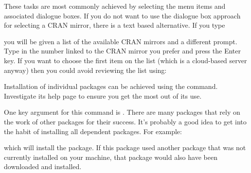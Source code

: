 These tasks are most commonly achieved by selecting the menu items and associated dialogue boxes. If you do not want to use the dialogue box approach for selecting a CRAN mirror, there is a text based alternative. If you type
\begin{knitrout}
\color{fgcolor}\begin{kframe}
\begin{alltt}
\hlstd{> }\hlstd{(}\hlstd{)}
\end{alltt}
\end{kframe}
\end{knitrout}
you will be given a list of the available CRAN mirrors and a different prompt. Type in the number linked to the CRAN mirror you prefer and press the Enter key. If you want to choose the first item on the list (which is a cloud-based server anyway) then you could avoid reviewing the list using:
\begin{knitrout}
\color{fgcolor}\begin{kframe}
\begin{alltt}
\hlstd{> }\hlstd{(}\hlstd{=}\hlstd{)}
\end{alltt}
\end{kframe}
\end{knitrout}

Installation of individual packages can be achieved using the  command. Investigate its help page to ensure you get the most out of its use. 

One key argument for this command is . There are many packages that rely on the work of other packages for their success. It's probably a good idea to get into the habit of installing all dependent packages. For example:
\begin{knitrout}
\color{fgcolor}\begin{kframe}
\begin{alltt}
\hlstd{> }\hlstd{(}\hlstd{,} \hlstd{=}\hlstd{)}
\end{alltt}
\end{kframe}
\end{knitrout}
which will install the  package. If this package used another package that was not currently installed on your machine, that package would also have been downloaded and installed.

